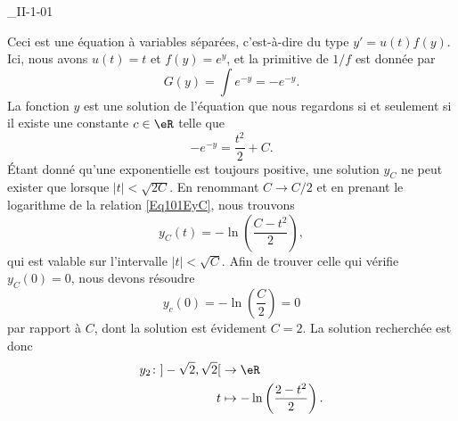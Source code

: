 

\begin{corrige}{_II-1-01}

Ceci est une équation à variables séparées, c'est-à-dire du type $y'=u(t)f(y)$. Ici, nous avons $u(t)=t$ et $f(y)= e^{y}$, et la primitive de $1/f$ est donnée par
\begin{equation}
	G(y)=\int e^{-y}=- e^{-y}.
\end{equation}
La fonction $y$ est une solution de l'équation que nous regardons si et seulement si il existe une constante $c\in\eR$ telle que
\begin{equation}		\label{Eq101EyC}
	- e^{-y}=\frac{ t^2 }{ 2 }+C.
\end{equation}
Étant donné qu'une exponentielle est toujours positive, une solution $y_C$ ne peut exister que lorsque $| t |<\sqrt{2C}$. En renommant $C\to C/2$ et en prenant le logarithme de la relation \eqref{Eq101EyC}, nous trouvons
\begin{equation}
	y_C(t)=-\ln\left( \frac{ C-t^2 }{ 2 } \right),
\end{equation}
qui est valable sur l'intervalle $| t |<\sqrt{C}$. Afin de trouver celle qui vérifie $y_C(0)=0$, nous devons résoudre
\begin{equation}
	y_c(0)=-\ln\left( \frac{ C }{ 2 } \right)=0
\end{equation}
par rapport à $C$, dont la solution est évidement $C=2$. La solution recherchée est donc
\begin{equation}
	\begin{aligned}
		y_2\colon ]-\sqrt{2},\sqrt{2}[&\to \eR \\
		t&\mapsto -\ln\left( \frac{ 2-t^2 }{2} \right).
	\end{aligned}
\end{equation}

\end{corrige}
